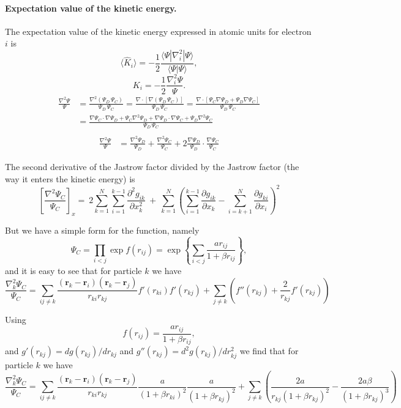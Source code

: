 \paragraph{Expectation value of the kinetic energy.}
The expectation value of the kinetic energy expressed in atomic units for electron $i$ is 
\[
 \langle \hat{K}_i \rangle = -\frac{1}{2}\frac{\langle\Psi|\nabla_{i}^2|\Psi \rangle}{\langle\Psi|\Psi \rangle},
\]
\begin{equation}
\label{kineticE}
K_i = -\frac{1}{2}\frac{\nabla_{i}^{2} \Psi}{\Psi}.
\end{equation}
\begin{align}
\frac{\nabla^2 \Psi}{\Psi} & =  \frac{\nabla^2 ({\Psi_{D} \,  \Psi_C})}{\Psi_{D} \,  \Psi_C} = \frac{\nabla  \cdot [\nabla  {(\Psi_{D} \,  \Psi_C)}]}{\Psi_{D} \,  \Psi_C} = \frac{\nabla  \cdot [ \Psi_C \nabla  \Psi_{D} + \Psi_{D} \nabla   \Psi_C]}{\Psi_{D} \,  \Psi_C}\nonumber\\
&  =  \frac{\nabla   \Psi_C \cdot \nabla  \Psi_{D} +  \Psi_C \nabla^2 \Psi_{D} + \nabla  \Psi_{D} \cdot \nabla   \Psi_C + \Psi_{D} \nabla^2  \Psi_C}{\Psi_{D} \,  \Psi_C}\nonumber\\
\end{align}
\begin{align}
\frac{\nabla^2 \Psi}{\Psi}
& =  \frac{\nabla^2 \Psi_{D}}{\Psi_{D}} + \frac{\nabla^2  \Psi_C}{ \Psi_C} + 2 \frac{\nabla  \Psi_{D}}{\Psi_{D}}\cdot\frac{\nabla   \Psi_C}{ \Psi_C}
\end{align}

The second derivative of the Jastrow factor divided by the Jastrow factor (the way it enters the kinetic energy) is
\[
\left[\frac{\nabla^2 \Psi_C}{\Psi_C}\right]_x =\  
2\sum_{k=1}^{N}
\sum_{i=1}^{k-1}\frac{\partial^2 g_{ik}}{\partial x_k^2}\ +\ 
\sum_{k=1}^N
\left(
\sum_{i=1}^{k-1}\frac{\partial g_{ik}}{\partial x_k} -
\sum_{i=k+1}^{N}\frac{\partial g_{ki}}{\partial x_i}
\right)^2
\]

But we have a simple form for the function, namely
\[
\Psi_{C}=\prod_{i< j}\exp{f(r_{ij})}= \exp{\left\{\sum_{i<j}\frac{ar_{ij}}{1+\beta r_{ij}}\right\}},
\]
and it is easy to see that for particle  $k$
we have
\[
  \frac{\nabla^2_k \Psi_C}{\Psi_C }=
\sum_{ij\ne k}\frac{(\mathbf{r}_k-\mathbf{r}_i)(\mathbf{r}_k-\mathbf{r}_j)}{r_{ki}r_{kj}}f'(r_{ki})f'(r_{kj})+
\sum_{j\ne k}\left( f''(r_{kj})+\frac{2}{r_{kj}}f'(r_{kj})\right)
\]

Using 
\[
f(r_{ij})= \frac{ar_{ij}}{1+\beta r_{ij}},
\]
and $g'(r_{kj})=dg(r_{kj})/dr_{kj}$ and 
$g''(r_{kj})=d^2g(r_{kj})/dr_{kj}^2$  we find that for particle  $k$
we have
\[
  \frac{\nabla^2_k \Psi_C}{\Psi_C }=
\sum_{ij\ne k}\frac{(\mathbf{r}_k-\mathbf{r}_i)(\mathbf{r}_k-\mathbf{r}_j)}{r_{ki}r_{kj}}\frac{a}{(1+\beta r_{ki})^2}
\frac{a}{(1+\beta r_{kj})^2}+
\sum_{j\ne k}\left(\frac{2a}{r_{kj}(1+\beta r_{kj})^2}-\frac{2a\beta}{(1+\beta r_{kj})^3}\right)
\]

